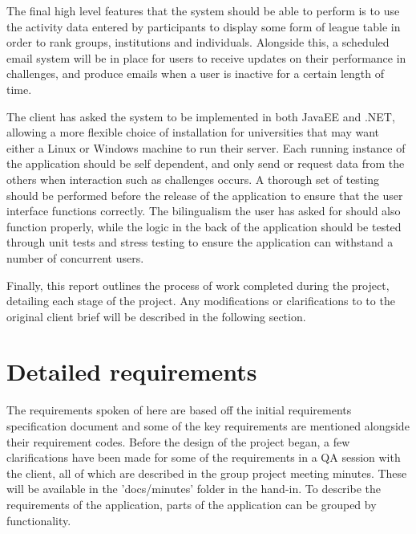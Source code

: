 The final high level features that the system should be able to perform is to use the activity data entered by participants to display some form of league table in order to rank groups, institutions and individuals. Alongside this, a scheduled email system will be in place for users to receive updates on their performance in challenges, and produce emails when a user is inactive for a certain length of time.\par
The client has asked the system to be implemented in both JavaEE and .NET, allowing a more flexible choice of installation for universities that may want either a Linux or Windows machine to run their server. Each running instance of the application should be self dependent, and only send or request data from the others when interaction such as challenges occurs. A thorough set of testing should be performed before the release of the application to ensure that the user interface functions correctly. The bilingualism the user has asked for should also function properly, while the logic in the back of the application should be tested through unit tests and stress testing to ensure the application can withstand a number of concurrent users.\par
Finally, this report outlines the process of work completed during the project, detailing each stage of the project. Any modifications or clarifications to to the original client brief will be described in the following section.

\section{Detailed requirements}
The requirements spoken of here are based off the initial requirements specification document \cite{initialReq} and some of the key requirements are mentioned alongside their requirement codes. Before the design of the project began, a few clarifications have been made for some of the requirements in a QA session with the client, all of which are described in the group project meeting minutes. These will be available in the 'docs/minutes' folder in the hand-in. To describe the requirements of the application, parts of the application can be grouped by functionality. \par
